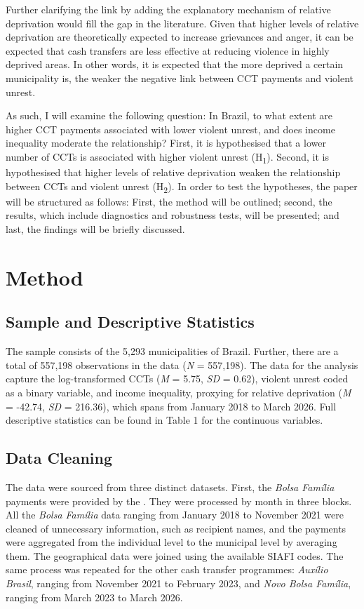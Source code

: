 \documentclass[stu,12pt]{apa7}
\begin{document}
Further clarifying the link by adding the explanatory mechanism of relative deprivation would fill the gap in the literature. Given that higher levels of relative deprivation are theoretically expected to increase grievances and anger, it can be expected that cash transfers are less effective at reducing violence in highly deprived areas. In other words, it is expected that the more deprived a certain municipality is, the weaker the negative link between CCT payments and violent unrest.

As such, I will examine the following question: In Brazil, to what extent are higher CCT payments associated with lower violent unrest, and does income inequality moderate the relationship? First, it is hypothesised that a lower number of CCTs is associated with higher violent unrest (H\textsubscript{1}). Second, it is hypothesised that higher levels of relative deprivation weaken the relationship between CCTs and violent unrest (H\textsubscript{2}). In order to test the hypotheses, the paper will be structured as follows: First, the method will be outlined; second, the results, which include diagnostics and robustness tests, will be presented; and last, the findings will be briefly discussed.

\section{Method}

\subsection{Sample and Descriptive Statistics}

The sample consists of the 5,293 municipalities of Brazil. Further, there are a total of 557,198 observations in the data (\textit{N} = 557,198). The data for the analysis capture the log-transformed CCTs (\textit{M} = 5.75, \textit{SD} = 0.62), violent unrest coded as a binary variable, and income inequality, proxying for relative deprivation (\textit{M} = -42.74, \textit{SD} = 216.36), which spans from January 2018 to March 2026. Full descriptive statistics can be found in Table 1 for the continuous variables.



\subsection{Data Cleaning}

The data were sourced from three distinct datasets. First, the \textit{Bolsa Família} payments were provided by the \textcite{CECAD20a}. They were processed by month in three blocks. All the \textit{Bolsa Família} data ranging from January 2018 to November 2021 were cleaned of unnecessary information, such as recipient names, and the payments were aggregated from the individual level to the municipal level by averaging them. The geographical data were joined using the available SIAFI codes. The same process was repeated for the other cash transfer programmes: \textit{Auxílio Brasil}, ranging from November 2021 to February 2023, and \textit{Novo Bolsa Família}, ranging from March 2023 to March 2026.
\end{document}

